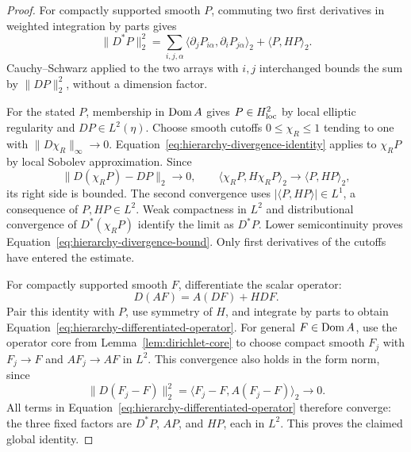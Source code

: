 \begin{proof}
For compactly supported smooth $P$, commuting two first derivatives in
weighted integration by parts gives
\begin{equation}\label{eq:hierarchy-divergence-identity}
 \|D^*P\|_2^2
 =\sum_{i,j,\alpha}
       \langle\partial_jP_{i\alpha},\partial_iP_{j\alpha}\rangle_2
   +\langle P,HP\rangle_2.
\end{equation}
Cauchy--Schwarz applied to the two arrays with $i,j$ interchanged bounds
the sum by $\|DP\|_2^2$, without a dimension factor.

For the stated $P$, membership in $\operatorname{Dom} A$ gives $P\in H^2_{\rm loc}$
by local elliptic regularity and $DP\in L^2(\eta)$.  Choose smooth
cutoffs $0\le\chi_R\le1$ tending to one with
$\|D\chi_R\|_\infty\to0$.  Equation~\eqref{eq:hierarchy-divergence-identity}
applies to $\chi_RP$ by local Sobolev approximation.  Since
\[
 \|D(\chi_RP)-DP\|_2\longrightarrow0,
 \qquad
 \langle\chi_RP,H\chi_RP\rangle_2
   \longrightarrow\langle P,HP\rangle_2,
\]
its right side is bounded.  The second convergence uses
$|\langle P,HP\rangle|\in L^1$, a consequence of $P,HP\in L^2$.
Weak compactness in $L^2$ and distributional convergence of
$D^*(\chi_RP)$ identify the limit as $D^*P$.  Lower semicontinuity
proves Equation~\eqref{eq:hierarchy-divergence-bound}.  Only first
derivatives of the cutoffs have entered the estimate.

For compactly supported smooth $F$, differentiate the scalar operator:
\[
 D(AF)=A(DF)+HDF.
\]
Pair this identity with $P$, use symmetry of $H$, and integrate by
parts to obtain Equation~\eqref{eq:hierarchy-differentiated-operator}.
For general $F\in\operatorname{Dom} A$, use the operator core from
Lemma~\ref{lem:dirichlet-core} to choose compact smooth $F_j$ with
$F_j\to F$ and $AF_j\to AF$ in $L^2$.  This convergence also holds
in the form norm, since
\[
 \|D(F_j-F)\|_2^2
 =\langle F_j-F,A(F_j-F)\rangle_2\longrightarrow0.
\]
All terms in Equation~\eqref{eq:hierarchy-differentiated-operator}
therefore converge: the three fixed factors are $D^*P$, $AP$, and
$HP$, each in $L^2$.  This proves the claimed global identity.
\end{proof}

